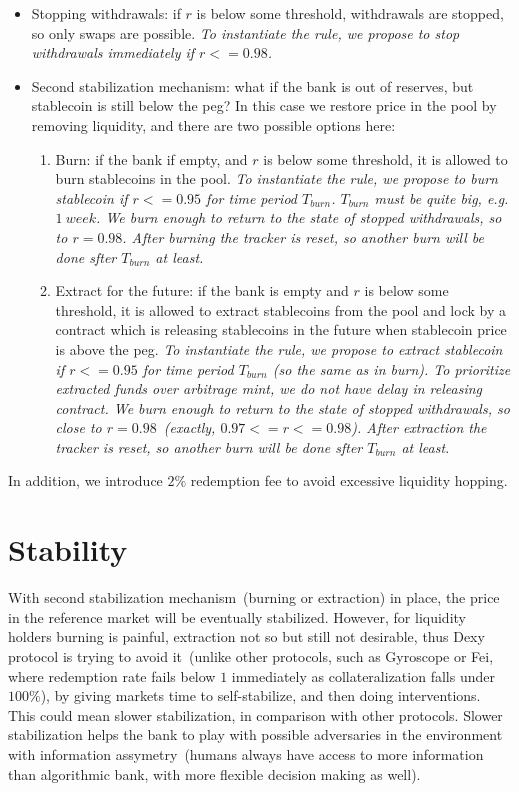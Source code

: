 \documentclass{article}   %
\newcommand{\sct}{stablecoin}
\newcommand{\dx}{Dexy}
\begin{document}
\begin{itemize}
   \item{Stopping withdrawals: } if $r$ is below some threshold, withdrawals are stopped, so only swaps are possible.  
   \em{To instantiate the rule, we propose to stop withdrawals immediately if $r <= 0.98$.}

   \item{Second stabilization mechanism: } what if the bank is out of reserves, but \sct{} is still below the peg? In this case we restore price in the pool by removing liquidity, and there are two possible options here:

   \begin{enumerate}
   \item{Burn: } if the bank if empty, and $r$ is below some threshold, it is allowed to burn \sct{}s in the pool. 
   \em{To instantiate the rule, we propose to burn \sct{} if $r <= 0.95$ for time period $T_{burn}$. $T_{burn}$ must be quite big, e.g. $1 {\ week}$. We burn enough to return to the state of stopped withdrawals, so to $r = 0.98$. After burning the tracker is reset, so another burn will be done sfter $T_{burn}$ at least.}

   \item{Extract for the future: } if the bank is empty and $r$ is below some threshold, it is allowed to extract \sct{}s from the pool and lock by a contract which is releasing \sct{}s in the future when \sct{} price is above the peg.
   \em{To instantiate the rule, we propose to extract \sct{} if $r <= 0.95$ for time period $T_{burn}$ (so the same as in burn). 
   To prioritize extracted funds over arbitrage mint, we do not have delay in releasing contract. We burn enough to return to the state of stopped withdrawals, so close to $r = 0.98$~(exactly, $0.97 <= r <= 0.98$). After extraction the tracker is reset, so another burn will be done sfter $T_{burn}$ at least.}
   \end{enumerate}
\end{itemize} 

In addition, we introduce $2\%$ redemption fee to avoid excessive liquidity hopping.

\section{Stability}
\label{stability}

With second stabilization mechanism~(burning or extraction) in place, the price in the reference market will be eventually stabilized. However, for liquidity holders burning is painful, extraction not so but still not desirable, thus \dx{} protocol is trying to avoid it~(unlike other protocols, such as Gyroscope or Fei, where redemption rate fails below $1$ immediately as collateralization falls under $100\%$), by giving markets time to self-stabilize, and then doing interventions. This could mean slower stabilization, in comparison with other protocols. Slower stabilization helps the bank to play with possible adversaries in the environment with information assymetry~(humans always have access to more information than algorithmic bank, with more flexible decision making as well).
\end{document}

